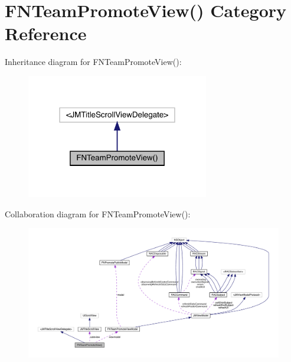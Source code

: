 \hypertarget{category_f_n_team_promote_view_07_08}{}\section{F\+N\+Team\+Promote\+View() Category Reference}
\label{category_f_n_team_promote_view_07_08}


Inheritance diagram for F\+N\+Team\+Promote\+View()\+:\nopagebreak
\begin{figure}[H]
\begin{center}
\leavevmode
\includegraphics[width=226pt]{category_f_n_team_promote_view_07_08__inherit__graph}
\end{center}
\end{figure}


Collaboration diagram for F\+N\+Team\+Promote\+View()\+:\nopagebreak
\begin{figure}[H]
\begin{center}
\leavevmode
\includegraphics[width=350pt]{category_f_n_team_promote_view_07_08__coll__graph}
\end{center}
\end{figure}
